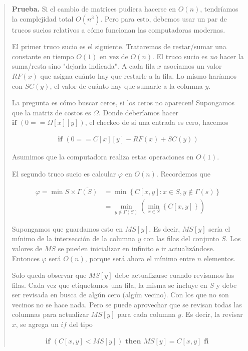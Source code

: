 \documentclass[a4paper]{article}
\begin{document}
\small
\begin{quote}

    \textbf{Prueba.} Si el cambio de matrices pudiera hacerse en $O(n)$, tendríamos la 
    complejidad total $O(n^3)$. Pero para esto, debemos usar un par de trucos 
    sucios relativos a cómo funcionan las computadoras modernas.

    El primer truco sucio es el siguiente. Trataremos de restar/sumar una constante 
    en tiempo $O(1)$ en vez de $O(n)$. El truco sucio es \textit{no} hacer la suma/resta 
    sino "dejarla indicada". A cada fila $x$ asociamos un valor $RF(x)$ que asigna 
    cuánto hay que restarle a la fila. Lo mismo haríamos con $SC(y)$, el valor de 
    cuánto hay que sumarle a la columna $y$.

    La pregunta es cómo buscar ceros, si los ceros no aparecen! Supongamos que la matriz 
    de costos es $\Omega$. Donde deberíamos hacer $\textbf{if }(0 == \Omega[x][y])$,
    el checkeo de si una entrada es cero, hacemos 

    \begin{align*}
        \textbf{if } \left(0 == C[x][y] - RF(x) + SC(y)\right)
    \end{align*}

    Asumimos que la computadora realiza estas operaciones en $O(1)$.

    El segundo truco sucio es calcular $\varphi$ en $O(n)$. Recordemos que 

    \begin{align*}
        \varphi = \min S \times \overline{\Gamma(S)} &= \min \left\{ C[x, y] : x \in S, y \not\in \Gamma(s) \right\}  \\ 
                                                     &= \min_{y \not\in \Gamma(S)} \left( \min_{x \in S} \left\{ C[x, y] \right\} \right) 
    \end{align*}

    Supongamos que guardamos esto en $MS[y]$. Es decir, $MS[y]$ sería el mínimo
    de la intersección de la columna $y$ con las filas del conjunto $S$. Los
    valores de $MS$ se pueden inicializar en infinito e ir actualizándose.
    Entonces $\varphi$ será $O(n)$, porque será ahora el mínimo entre $n$
    elementos. 

    Solo queda observar que $MS[y]$ debe actualizarse cuando revisamos las
    filas. Cada vez que etiquetamos una fila, la misma se incluye en $S$ y debe
    ser revisada en busca de algún cero (algún vecino). Con los que no son vecinos 
    no se hace nada. Pero se puede aprovechar que se revisan todas las columnas para 
    actualizar $MS[y]$ para cada columna $y$. Es decir, la revisar $x$, se agrega 
     un $if$ del tipo 

     \begin{align*}
         \textbf{if } (C[x, y] < MS[y]) \textbf{ then } MS[y] = C[x, y] \textbf{ fi }
     \end{align*}



\end{quote}
\normalsize
\end{document}

